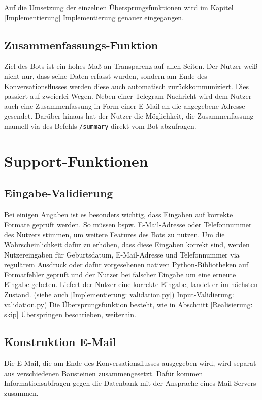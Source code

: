             Auf die Umsetzung der einzelnen Übersprungsfunktionen wird im Kapitel \ref{Implementierung} Implementierung genauer eingegangen.
    
        \subsection{Zusammenfassungs-Funktion}
            Ziel des Bots ist ein hohes Maß an Transparenz auf allen Seiten. Der Nutzer weiß nicht nur, dass seine Daten erfasst wurden, sondern am Ende des Konversationsflusses werden diese auch automatisch zurückkommuniziert. Dies passiert auf zweierlei Wegen. Neben einer Telegram-Nachricht wird dem Nutzer auch eine Zusammenfassung in Form einer E-Mail an die angegebene Adresse gesendet. Darüber hinaus hat der Nutzer die Möglichkeit, die Zusammenfassung manuell via des Befehls \verb|/summary| direkt vom Bot abzufragen.            


    \section{Support-Funktionen}
        
        \subsection{Eingabe-Validierung} \label{Realisierung: Validation}
            Bei einigen Angaben ist es besonders wichtig, dass Eingaben auf korrekte Formate geprüft werden. So müssen bspw. E-Mail-Adresse oder Telefonnummer des Nutzers stimmen, um weitere Features des Bots zu nutzen. Um die Wahrscheinlichkeit dafür zu erhöhen, dass diese Eingaben korrekt sind, werden Nutzereingaben für Geburtsdatum, E-Mail-Adresse und Telefonnummer via regulärem Ausdruck oder dafür vorgesehenen nativen Python-Bibliotheken auf Formatfehler geprüft und der Nutzer bei falscher Eingabe um eine erneute Eingabe gebeten. Liefert der Nutzer eine korrekte Eingabe, landet er im nächsten Zustand. (siehe auch \ref*{Implementierung: validation.py}) Input-Validierung: validation.py) Die Übersprungsfunktion besteht, wie in Abschnitt \ref*{Realisierung: skip} Überspringen beschrieben, weiterhin.
        
        \subsection{Konstruktion E-Mail} \label{Realisierung: email}
            Die E-Mail, die am Ende des Konversationsflusses ausgegeben wird, wird separat aus verschiedenen Bausteinen zusammengesetzt. Dafür kommen Informationsabfragen gegen die Datenbank mit der Ansprache eines Mail-Servers zusammen.
        
